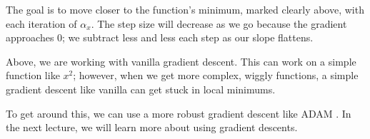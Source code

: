 The goal is to move closer to the function's minimum, marked clearly above, with each iteration of $\alpha_x$. The step size will decrease as we go because the gradient approaches $0$; we subtract less and less each step as our slope flattens. 

Above, we are working with vanilla gradient descent. This can work on a simple function like $x^2$; however, when we get more complex, wiggly functions, a simple gradient descent like vanilla can get stuck in local minimums.

To get around this, we can use a more robust gradient descent like ADAM \cite{kingma2014adam}. In the next lecture, we will learn more about using gradient descents. 




